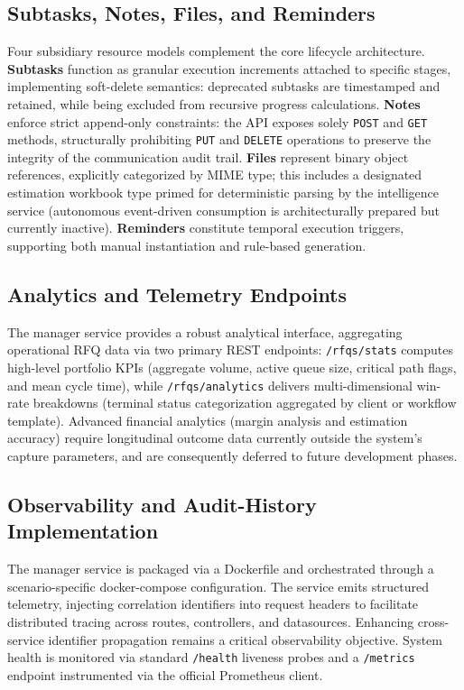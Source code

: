 \subsection{Subtasks, Notes, Files, and Reminders}\label{sec:manager_resources}
Four subsidiary resource models complement the core lifecycle architecture. \textbf{Subtasks} function as granular execution increments attached to specific stages, implementing soft-delete semantics: deprecated subtasks are timestamped and retained, while being excluded from recursive progress calculations. \textbf{Notes} enforce strict append-only constraints: the API exposes solely \texttt{POST} and \texttt{GET} methods, structurally prohibiting \texttt{PUT} and \texttt{DELETE} operations to preserve the integrity of the communication audit trail. \textbf{Files} represent binary object references, explicitly categorized by MIME type; this includes a designated estimation workbook type primed for deterministic parsing by the intelligence service (autonomous event-driven consumption is architecturally prepared but currently inactive). \textbf{Reminders} constitute temporal execution triggers, supporting both manual instantiation and rule-based generation.

\subsection{Analytics and Telemetry Endpoints}\label{sec:manager_analytics}
The manager service provides a robust analytical interface, aggregating operational RFQ data via two primary REST endpoints: \texttt{/rfqs/stats} computes high-level portfolio KPIs (aggregate volume, active queue size, critical path flags, and mean cycle time), while \texttt{/rfqs/analytics} delivers multi-dimensional win-rate breakdowns (terminal status categorization aggregated by client or workflow template). Advanced financial analytics (margin analysis and estimation accuracy) require longitudinal outcome data currently outside the system's capture parameters, and are consequently deferred to future development phases.

\subsection{Observability and Audit-History Implementation}\label{sec:manager_observability}
The manager service is packaged via a Dockerfile and orchestrated through a scenario-specific docker-compose configuration. The service emits structured telemetry, injecting correlation identifiers into request headers to facilitate distributed tracing across routes, controllers, and datasources. Enhancing cross-service identifier propagation remains a critical observability objective. System health is monitored via standard \texttt{/health} liveness probes and a \texttt{/metrics} endpoint instrumented via the official Prometheus client.

